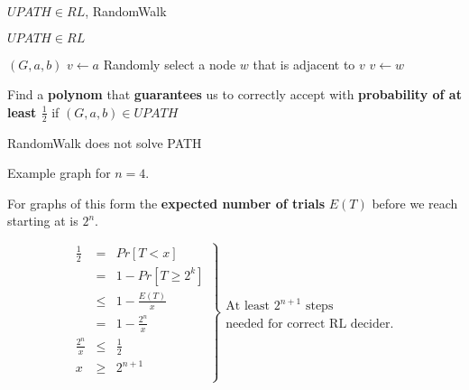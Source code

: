 \begin{frame}{$UPATH \in RL$, RandomWalk}

\begin{theorem}
$UPATH \in RL$
\end{theorem}

\renewcommand{\algorithmicrequire}{\textbf{Input:}}
\renewcommand{\algorithmicensure}{\textbf{Output:}}

\begin{algorithmic}
\Require $(G, a, b)$
\State $v \gets a$
    \State Randomly select a node $w$ that is adjacent to $v$
    \State $v \gets w$
    \EndIf
\EndFor
{}
\end{algorithmic}

Find a \textbf{polynom}  that
\textbf{guarantees} us to correctly accept with \textbf{probability of
at least $\frac{1}{2}$} if $(G, a, b) \in UPATH$

\end{frame}

\begin{frame}{RandomWalk does not solve PATH}

Example graph for $n=4$.

\begin{center}
\end{center}

For graphs of this form the \textbf{expected number of trials} $E(T)$
before we reach  starting at  is $2^{n}$.

\[
\left.
\begin{array}{rcl}
\frac{1}{2} & = & Pr[T < x] \\
            & = & 1 - Pr[T \geq 2^k] \\
            & \leq & 1 - \frac{E(T)}{x} \\
            & = & 1 - \frac{2^n}{x} \\
\frac{2^n}{x} & \leq & \frac{1}{2} \\
x & \geq & 2^{n+1} \\
\end{array}
\right\}
\begin{array}{l}
\text{At least } 2^{n+1} \text{ steps}\\
\text{needed for correct RL decider.}
\end{array}
\]

\end{frame}

